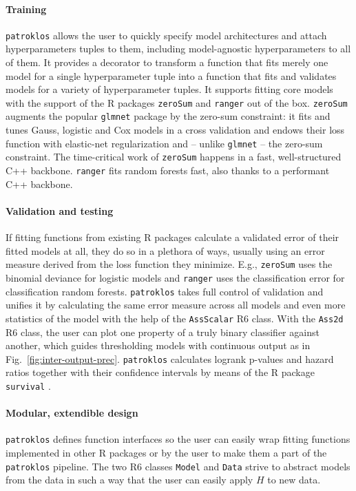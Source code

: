 \paragraph{Training} 
\texttt{patroklos} allows the user to quickly specify model architectures and 
attach hyperparameters tuples to them, including model-agnostic hyperparameters to all of them. It 
provides a decorator to transform a function that fits merely one model for a single hyperparameter 
tuple into a function that fits and validates models for a variety of hyperparameter tuples. 
It supports fitting core models with the support of the R packages \texttt{zeroSum} 
\cite{zerosumR} and \texttt{ranger} \cite{ranger17} out of the box. \texttt{zeroSum} 
augments the popular \texttt{glmnet} package by the zero-sum constraint: it fits and 
tunes Gauss, logistic and Cox models in a cross validation and endows their loss function 
with elastic-net regularization and -- unlike \texttt{glmnet} -- the zero-sum 
constraint. The time-critical work of \texttt{zeroSum} happens in a fast, well-structured C++ 
backbone. \texttt{ranger} fits random forests fast, also thanks to a performant C++ backbone. 

\paragraph{Validation and testing} 
If fitting functions from existing R packages calculate a validated error of 
their fitted models at all, they do so in a plethora of ways, usually using an error measure derived 
from the loss function they minimize. E.g., \texttt{zeroSum} uses the binomial deviance for 
logistic models and \texttt{ranger} uses the classification error for classification random 
forests. \texttt{patroklos} takes 
full control of validation and unifies it
by calculating the same error measure across all models and even more statistics of the model
with the help of the \texttt{AssScalar} R6 class. With the \texttt{Ass2d} R6 class, the 
user can plot one property of a truly binary classifier against another, which guides 
thresholding models with continuous output as in Fig.\ \ref{fig:inter-output-prec}. 
\texttt{patroklos} calculates logrank p-values and hazard ratios together with their confidence
intervals by means of the R package \texttt{survival} \cite{survival-cran}.

\paragraph{Modular, extendible design} 
\texttt{patroklos} defines function interfaces so the user 
can easily wrap fitting functions implemented in other R packages or by the user to make 
them a part of the \texttt{patroklos} pipeline. The two R6 classes \texttt{Model} and \texttt{Data}
strive to abstract models from the data in such a way that the user can easily apply $H$ to new 
data.

